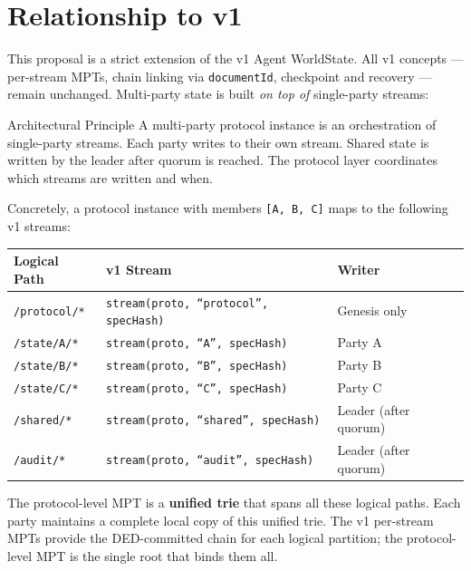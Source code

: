 \documentclass[11pt,a4paper]{article}
\begin{document}
\section{Relationship to v1}

This proposal is a strict extension of the v1 Agent WorldState. All v1
concepts --- per-stream MPTs, chain linking via \texttt{documentId}, checkpoint
and recovery --- remain unchanged. Multi-party state is built \emph{on top of}
single-party streams:

\begin{defbox}{Architectural Principle}
A multi-party protocol instance is an orchestration of single-party streams.
Each party writes to their own stream. Shared state is written by the leader
after quorum is reached. The protocol layer coordinates which streams are
written and when.
\end{defbox}

\noindent Concretely, a protocol instance with members \texttt{[A, B, C]} maps to
the following v1 streams:

\begin{center}
\begin{tabular}{lll}
\toprule
\textbf{Logical Path} & \textbf{v1 Stream} & \textbf{Writer} \\
\midrule
\texttt{/protocol/*} & \texttt{stream(proto, ``protocol'', specHash)} & Genesis only \\
\texttt{/state/A/*} & \texttt{stream(proto, ``A'', specHash)} & Party A \\
\texttt{/state/B/*} & \texttt{stream(proto, ``B'', specHash)} & Party B \\
\texttt{/state/C/*} & \texttt{stream(proto, ``C'', specHash)} & Party C \\
\texttt{/shared/*} & \texttt{stream(proto, ``shared'', specHash)} & Leader (after quorum) \\
\texttt{/audit/*} & \texttt{stream(proto, ``audit'', specHash)} & Leader (after quorum) \\
\bottomrule
\end{tabular}
\end{center}

\noindent The protocol-level MPT is a \textbf{unified trie} that spans all
these logical paths. Each party maintains a complete local copy of this
unified trie. The v1 per-stream MPTs provide the DED-committed chain for each
logical partition; the protocol-level MPT is the single root that binds them
all.
\end{document}
